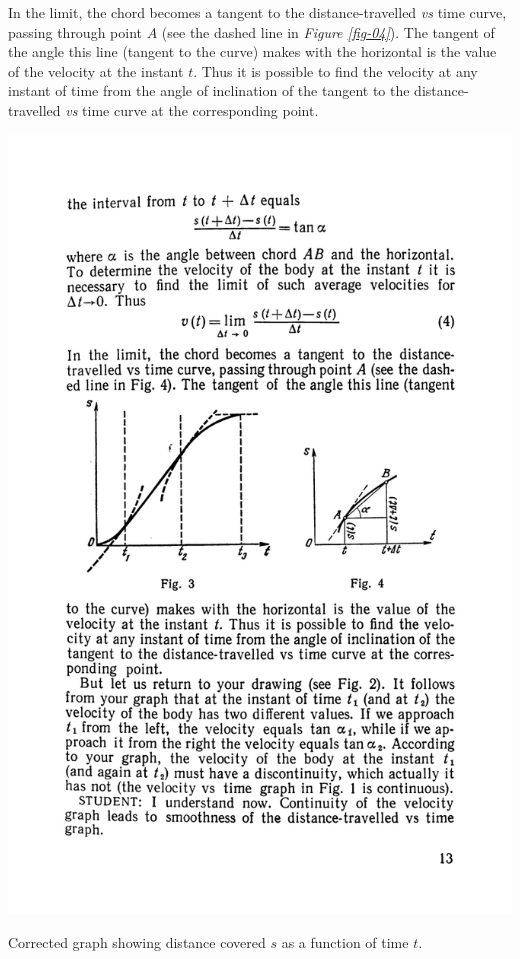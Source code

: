 \documentclass[a4paper,sfsidenotes]{tufte-book}
\begin{document}
In the limit, the chord becomes a tangent to the distance-travelled \emph{vs} time curve, passing through point $A$ (see the dashed line in \emph{Figure \ref{fig-04}}). The tangent of the angle this line (tangent to the curve) makes with the horizontal is the value of the velocity at the instant $t$. Thus it is possible to find the velocity at any instant of time from the angle of inclination of the tangent to the distance-travelled \emph{vs} time curve at the corresponding point.
\begin{marginfigure}[.5cm]
\centering
\includegraphics[width=1.1\linewidth]{fig-004a.pdf}
\caption{Corrected graph showing distance covered $s$ as a function of time $t$.}
\label{fig-04}
\end{marginfigure}
\end{document}
